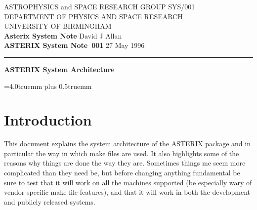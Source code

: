 \pagestyle{myheadings}
\newcommand{\astdoccategory}  {ASTERIX System Note}
\newcommand{\astdocinitials}  {SYS}
\newcommand{\astdocnumber}    {001}
\newcommand{\astdocauthors}   {David J Allan}
\newcommand{\astdocdate}      {27 May 1996}
\newcommand{\astdoctitle}     {ASTERIX System Architecture}
\newcommand{\astdocname}      {\astdocinitials /\astdocnumber}
\renewcommand{\_}             {{\tt\char'137}}


\setlength{\textwidth}{160mm}           %
\setlength{\textheight}{240mm}          %
\setlength{\oddsidemargin}{0pt}         %
\setlength{\evensidemargin}{0pt}        %
\setlength{\topmargin}{-5mm}            %
\setlength{\headsep}{8mm}               %
\setlength{\parindent}{0mm}

\thispagestyle{empty}
ASTROPHYSICS and SPACE RESEARCH GROUP \hfill \astdocname \\
DEPARTMENT OF PHYSICS AND SPACE RESEARCH\\
UNIVERSITY OF BIRMINGHAM\\
{\large\bf Asterix System Note} \hfill \astdocauthors\\
{\large\bf \astdoccategory\ \astdocnumber} \hfill \astdocdate\\
\vspace{-4mm}
\rule{\textwidth}{0.5mm}
\vspace{5mm}
\begin{center}
{\huge\bf \astdoctitle}
\end{center}
\vspace{5mm}

\parskip=4.0truemm plus 0.5truemm       %

\markright{\astdocname}
\tableofcontents
\newpage

\section{Introduction}

This document explains the system architecture of the ASTERIX package
and in particular the way in which make files are used. It also 
highlights some of the reasons why things are done the way they are.
Sometimes things me seem more complicated than they need be, but before
changing anything fundamental be sure to test that it will work on all
the machines supported (be especially wary of vendor specific make file
features), and that it will work in both the development and publicly 
released systems.

